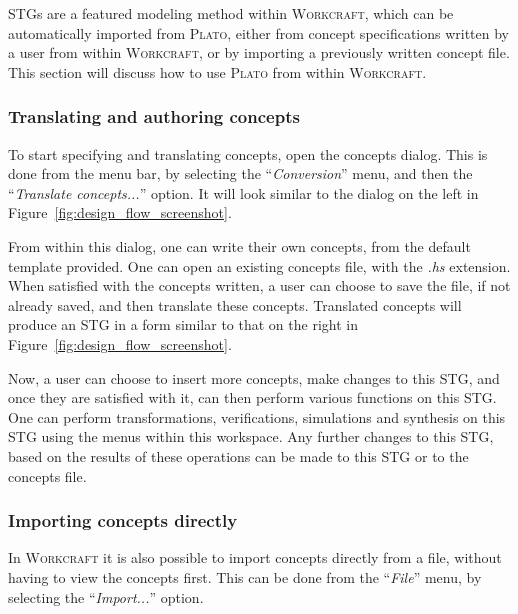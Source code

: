 \documentclass[british,conference,compsoc]{IEEEtran}
\newcommand{\noun}[1]{\textsc{#1}}
\begin{document}
STGs are a featured modeling method within \noun{Workcraft},
which can be automatically imported from \noun{Plato}, either from concept specifications written by a user from within 
\noun{Workcraft}, or by importing a previously written concept file. 
This section will discuss how to use \noun{Plato} from within
\noun{Workcraft}.

\vspace{-3.5mm}
 
\subsubsection{Translating and authoring concepts}

To start specifying and translating concepts, open the concepts dialog.  This is
done from the menu bar, by selecting the ``\emph{Conversion}'' menu, and then
the ``\emph{Translate concepts...}'' option. It will look similar to the dialog 
on the left in Figure~\ref{fig:design_flow_screenshot}.

From within this dialog, one can write their own concepts, from the default 
template provided. One can open an 
existing concepts file, with the \emph{.hs} extension. When satisfied with the 
concepts written, a user can choose to save the file, if not already saved, and
then translate these concepts. Translated concepts will produce an STG in a 
form similar to that on the right in Figure~\ref{fig:design_flow_screenshot}.

Now, a user can choose to insert more 
concepts, make changes to this STG, and once they are satisfied with it, can 
then perform various functions on this STG. One can perform transformations, 
verifications, simulations and synthesis on this STG using the menus within this 
workspace. Any further changes to this STG, based on the results of these 
operations can be made to this STG or to the concepts file. 

\subsubsection{Importing concepts directly}

\vspace{-3mm}

In \noun{Workcraft} it is also possible to import concepts directly from a file,
without having to view the concepts first. This can be done from the 
``\emph{File}'' menu, by selecting the ``\emph{Import...}'' option. 
\end{document}
